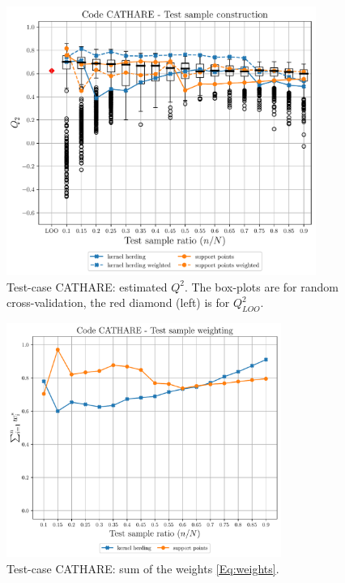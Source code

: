 \begin{figure}
    \centering
    \includegraphics[width=0.9\textwidth]{./part2/figures/SIS/cathareC2.pdf}
    \caption{Test-case CATHARE: estimated $Q^2$. The box-plots are for random cross-validation, the red diamond (left) is for $Q^2_{LOO}$.}
    \label{fig:cathareC2_benchmark}
\end{figure}

\begin{figure}
    \centering
    \includegraphics[width=0.8\textwidth]{./part2/figures/SIS/cathareC2_weights.pdf}
    \caption{Test-case CATHARE: sum of the weights \eqref{Eq:weights}.}
    \label{fig:catharec2_weights}
\end{figure}





